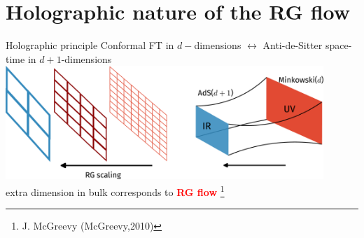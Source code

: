 \documentclass[11pt,aspectratio=169]{beamer}
\newcommand{\focus}[1]{\textcolor{red}{\bf{#1}}}
\begin{document}
\section{Holographic nature of the RG flow}
\begin{frame}{Holographic principle}
Conformal FT in \(d-\)dimensions \(\longleftrightarrow\) Anti-de-Sitter space-time in \(d+1\)-dimensions\\[10pt]
\includegraphics[width=0.9\textwidth]{figures/holography.pdf}\\[10pt]
extra dimension in bulk corresponds to \focus{RG flow}
\footnote{J. McGreevy (McGreevy,2010)}
\end{frame}
\end{document}

